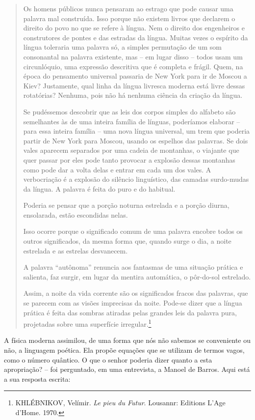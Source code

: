 \begin{quote}
Os homens públicos nunca pensaram ao estrago que pode causar uma palavra
mal construída. Isso porque não existem livros que declarem o direito do
povo no que se refere à língua. Nem o direito dos engenheiros e
construtores de pontes e das estradas da língua. Muitas vezes o espírito
da língua toleraria uma palavra só, a simples permutação de um som
consonantal na palavra existente, mas -- em lugar disso -- todos usam um
circunlóquio, uma expressão descritiva que é completa e frágil. Quem, na
época do pensamento universal passaria de New York para ir de Moscou a
Kiev? Justamente, qual linha da língua livresca moderna está livre
dessas rotatórias? Nenhuma, pois não há nenhuma ciência da criação da
língua.

Se pudéssemos descobrir que as leis dos corpos simples do alfabeto são
semelhantes às de uma inteira família de línguas, poderíamos elaborar --
para essa inteira família -- uma nova língua universal, um trem que
poderia partir de New York para Moscou, usando os espelhos das palavras.
Se dois vales aparecem separados por uma cadeia de montanhas, o viajante
que quer passar por eles pode tanto provocar a explosão dessas montanhas
como pode dar a volta delas e entrar em cada um dos vales. A
verbocriação é a explosão do silêncio linguístico, das camadas
surdo-mudas da língua. A palavra é feita do puro e do habitual.

Poderia se pensar que a porção noturna estrelada e a porção diurna,
ensolarada, estão escondidas nelas.

Isso ocorre porque o significado comum de uma palavra encobre todos os
outros significados, da mesma forma que, quando surge o dia, a noite
estrelada e as estrelas desvanecem.

A palavra ``autônoma'' renuncia aos fantasmas de uma situação prática e
salienta, faz surgir, em lugar da mentira automática, o pôr-do-sol
estrelado.

Assim, a noite da vida corrente são os significados fracos das palavras,
que se parecem com as visões imprecisas da noite. Pode-se dizer que a
língua prática é feita das sombras atiradas pelas grandes leis da
palavra pura, projetadas sobre uma superfície irregular.\footnote{KHLÉBNIKOV,
  Velímir. \emph{Le pieu du Futur}. Lousannr: Editions L'Age d'Home.
  1970.}
\end{quote}

A física moderna assimilou, de uma forma que nós não sabemos se
conveniente ou não, a linguagem poética. Ela propõe equações que se
utilizam de termos vagos, como o número quântico. O que o senhor poderia
dizer quanto a esta apropriação? -- foi perguntado, em uma entrevista, a
Manoel de Barros. Aqui está a sua resposta escrita:

